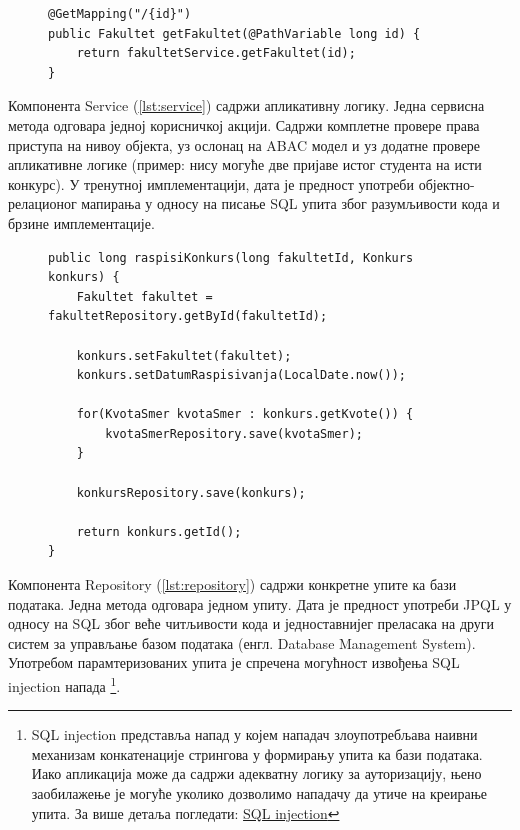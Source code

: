 \documentclass[a4paper]{article}
\begin{document}
\begin{figure}[H]
\begin{lstlisting}[caption={Пример Controller методе},label={lst:controller},captionpos=b]
@GetMapping("/{id}")
public Fakultet getFakultet(@PathVariable long id) {
    return fakultetService.getFakultet(id);
}
\end{lstlisting}
\end{figure}

Компонента Service (\autoref{lst:service}) садржи апликативну логику. Једна сервисна метода одговара једној корисничкој акцији. Садржи комплетне
провере права приступа на нивоу објекта, уз ослонац на ABAC\cite{abac} модел и уз додатне провере апликативне логике
(пример: нису могуће две пријаве истог студента на исти конкурс). У тренутној имплементацији, дата је предност употреби
објектно-релационог мапирања у односу на писање SQL упита због разумљивости кода и брзине имплементације.

\begin{figure}[H]
\begin{lstlisting}[caption={Пример Service методе},label={lst:service},captionpos=b]
public long raspisiKonkurs(long fakultetId, Konkurs konkurs) {
    Fakultet fakultet = fakultetRepository.getById(fakultetId);

    konkurs.setFakultet(fakultet);
    konkurs.setDatumRaspisivanja(LocalDate.now());

    for(KvotaSmer kvotaSmer : konkurs.getKvote()) {
        kvotaSmerRepository.save(kvotaSmer);
    }

    konkursRepository.save(konkurs);

    return konkurs.getId();
}
\end{lstlisting}
\end{figure}

Компонента Repository (\autoref{lst:repository}) садржи конкретне упите ка бази података. Једна метода одговара једном упиту. Дата је предност
употреби JPQL у односу на SQL због веће читљивости кода и једноставнијег преласака на други систем за управљање базом података (енгл. Database Management System). Употребом парамтеризованих упита је спречена могућност извођења SQL injection напада
\footnote{SQL injection представља напад у којем нападач злоупотребљава наивни механизам конкатенације стрингова у формирању упита ка бази података.
Иако апликација може да садржи адекватну логику за ауторизацију, њено заобилажење је могуће уколико дозволимо нападачу да утиче на креирање упита.
За више детаља погледати: \href{https://portswigger.net/web-security/sql-injection}{SQL injection}}.
\end{document}
